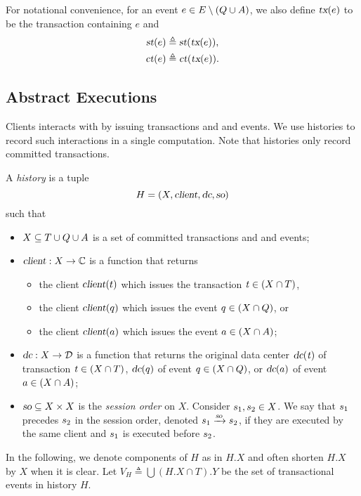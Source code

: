 For notational convenience,
for an event $e \in E \setminus (Q \cup A)$, we also define
$\textsl{tx}(e)$ to be the transaction containing $e$ and
\begin{align*}
  \textsl{st}(e) &\triangleq \textsl{st}(\textsl{tx}(e)), \\
  \textsl{ct}(e) &\triangleq \textsl{ct}(\textsl{tx}(e)).
\end{align*}
\subsection{Abstract Executions} \label{ss:cm}

Clients interacts with \unistore{} by issuing transactions
and \fence{} and \attach{} events.
We use histories to record such interactions in a single computation.
Note that histories only record committed transactions.
\begin{appdefinition}[Histories] \label{def:histories}
  A \emph{history} is a tuple
  \[
    H = (X, \textsl{client}, \textsl{dc}, \textsl{so})
  \]
  such that
  \begin{itemize}
    \item $X \subseteq T \cup Q \cup A$
      is a set of committed transactions and \fence{} and \attach{} events;
    \item $\textsl{client}: X \to \mathbb{C}$ is a function that returns
      \begin{itemize}
        \item the client $\textsl{client}(t)$ which issues the transaction
          $\mathit{t} \in (X \cap T)$,
        \item the client $\textsl{client}(q)$ which issues the \fence{} event
          $q \in (X \cap Q)$, or
        \item the client $\textsl{client}(a)$ which issues the \attach{} event
          $a \in (X \cap A)$;
      \end{itemize}
    \item $\textsl{dc}: X \to \mathcal{D}$ is a function
      that returns the original data center $\textsl{dc}(\mathit{t})$
      of transaction $\mathit{t} \in (X \cap T)$,
      $\textsl{dc}(q)$ of \fence{} event $q \in (X \cap Q)$,
      or $\textsl{dc}(a)$ of \attach{} event $a \in (X \cap A)$;
    \item $\textsl{so} \subseteq X \times X$ is the \emph{session order} on $X$.
      Consider $s_{1}, s_{2} \in X$.
      We say that $s_{1}$ precedes $s_{2}$
      in the session order, denoted $s_{1} \xrightarrow{\textsl{so}} s_{2}$,
      if they are executed by the same client
      and $s_{1}$ is executed before $s_{2}$.
  \end{itemize}
\end{appdefinition}
In the following, we denote components of $H$ as in $H.X$
and often shorten $H.X$ by $X$ when it is clear.
Let $V_{H} \triangleq \bigcup (H.X \cap T).Y$
be the set of transactional events in history $H$.

